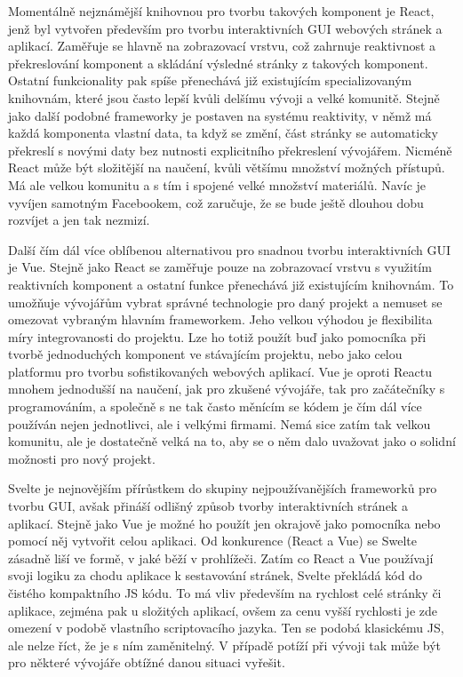 		Momentálně nejznámější knihovnou pro tvorbu takových komponent je React, jenž
		byl vytvořen především pro tvorbu interaktivních \Ac{GUI} webových stránek a
		aplikací.
		Zaměřuje se hlavně na zobrazovací vrstvu, což zahrnuje reaktivnost a překreslování komponent a skládání
		výsledné stránky z takových komponent.
		Ostatní funkcionality pak spíše přenechává již existujícím specializovaným knihovnám, které jsou
		často lepší kvůli delšímu vývoji a velké komunitě.
		Stejně jako další podobné frameworky je postaven na systému reaktivity, v němž má každá komponenta vlastní data,
		ta když se změní, část stránky se automaticky překreslí s novými daty bez nutnosti explicitního překreslení
		vývojářem.
		Nicméně React může být složitější na naučení, kvůli většímu množství možných přístupů.
		Má ale velkou komunitu a s tím i spojené velké množství materiálů.
		Navíc je vyvíjen samotným Facebookem, což zaručuje, že se bude ještě dlouhou dobu rozvíjet a jen tak
		nezmizí. \cite{react}

		Další čím dál více oblíbenou alternativou pro snadnou tvorbu interaktivních \Ac{GUI} je Vue.
		Stejně jako React se zaměřuje pouze na zobrazovací vrstvu s využitím reaktivních komponent a ostatní
		funkce přenechává již existujícím knihovnám.
		To umožňuje vývojářům vybrat správné technologie pro daný projekt a nemuset se omezovat vybraným hlavním frameworkem.
		Jeho velkou výhodou je flexibilita míry integrovanosti do projektu.
		Lze ho totiž použít buď jako pomocníka při tvorbě jednoduchých komponent ve stávajícím projektu, nebo jako
		celou platformu pro tvorbu sofistikovaných webových aplikací. \cite{vue_guide}
		Vue je oproti Reactu mnohem jednodušší na naučení, jak pro zkušené vývojáře, tak pro začátečníky
		s programováním, a společně s ne tak často měnícím se kódem je čím dál více používán nejen
		jednotlivci, ale i velkými firmami.
		Nemá sice zatím tak velkou komunitu, ale je dostatečně velká na to, aby se o něm dalo uvažovat
		jako o solidní možnosti pro nový projekt. \cite{vue_vs_react}

		Svelte je nejnovějším přírůstkem do skupiny nejpoužívanějších frameworků pro tvorbu \Ac{GUI}, avšak přináší odlišný
		způsob tvorby interaktivních stránek a aplikací.
		Stejně jako Vue je možné ho použít jen okrajově jako pomocníka nebo pomocí něj vytvořit celou aplikaci.
		Od konkurence (React a Vue) se Swelte zásadně liší ve formě, v jaké běží v prohlížeči.
		Zatím co React a Vue používají svoji logiku za chodu aplikace k sestavování stránek, Svelte překládá kód
		do čistého kompaktního \ac{JS} kódu.
		To má vliv především na rychlost celé stránky či aplikace, zejména pak u složitých aplikací,
		ovšem za cenu vyšší rychlosti je zde omezení v podobě vlastního scriptovacího jazyka. \cite{svelte_basics}
		Ten se podobá klasickému \ac{JS}, ale nelze říct, že je s ním zaměnitelný.
		V případě potíží při vývoji tak může být pro některé vývojáře obtížné danou situaci vyřešit. \cite{vue_vs_svelte}

